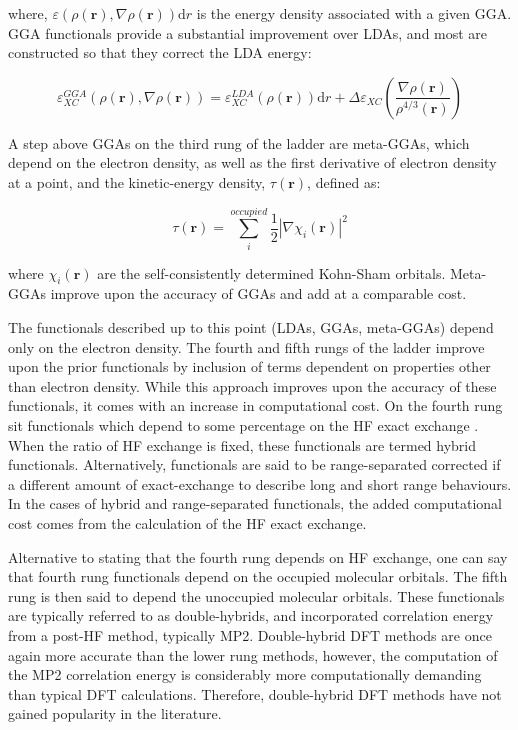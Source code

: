 \noindent where, $\varepsilon(\rho(\mathbf{r}), \nabla \rho(\mathbf{r})) \mathrm{d}r$ is the energy density associated with a given GGA. GGA functionals provide a substantial improvement over LDAs, and most are constructed so that they correct the LDA energy:

\begin{equation}
  \varepsilon_{XC}^{GGA}(\rho(\mathbf{r}), \nabla \rho(\mathbf{r})) = \varepsilon_{XC}^{LDA}(\rho(\mathbf{r})) \mathrm{d}r + \Delta \varepsilon_{XC}\left( \frac{\nabla \rho(\mathbf{r})}{\rho^{4/3}({\mathbf{r}})}\right)
\end{equation}

A step above GGAs on the third rung of the ladder are meta-GGAs, which depend on the electron density, as well as the first derivative of electron density at a point, and the kinetic-energy density, $\tau(\mathbf{r})$, defined as:

\begin{equation}
  \tau(\mathbf{r}) = \sum_i^{occupied} \frac{1}{2}|\nabla \chi_i(\mathbf{r})|^2
\end{equation}

\noindent where $\chi_i(\mathbf{r})$ are the self-consistently determined Kohn-Sham orbitals. Meta-GGAs improve upon the accuracy of GGAs and add at a comparable cost.\cite{Cramer2004}

The functionals described up to this point (LDAs, GGAs, meta-GGAs) depend only on the electron density. The fourth and fifth rungs of the ladder improve upon the prior functionals by inclusion of terms dependent on properties other than electron density. While this approach improves upon the accuracy of these functionals, it comes with an increase in computational cost. On the fourth rung sit functionals which depend to some percentage on the HF exact exchange . When the ratio of HF exchange is fixed, these functionals are termed hybrid functionals. Alternatively, functionals are said to be range-separated corrected if a different amount of exact-exchange to describe long and short range behaviours. In the cases of hybrid and range-separated functionals, the added computational cost comes from the calculation of the HF exact exchange.

Alternative to stating that the fourth rung depends on HF exchange, one can say that fourth rung functionals depend on the occupied molecular orbitals. The fifth rung is then said to depend the unoccupied molecular orbitals. These functionals are typically referred to as double-hybrids, and incorporated correlation energy from a post-HF method, typically MP2. Double-hybrid DFT methods are once again more accurate than the lower rung methods, however, the computation of the MP2 correlation energy is considerably more computationally demanding than typical DFT calculations. Therefore, double-hybrid DFT methods have not gained popularity in the literature.

